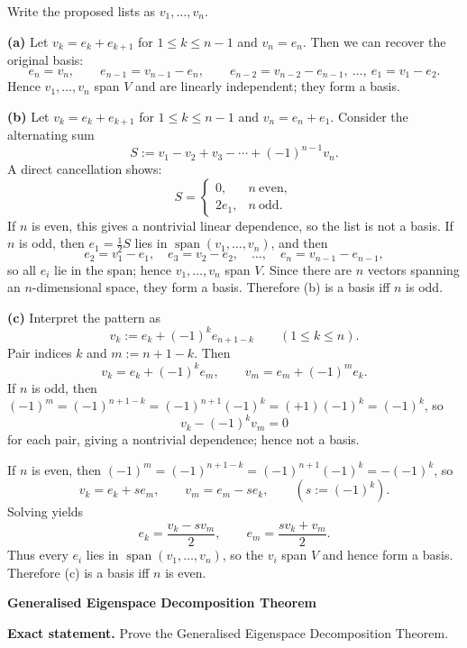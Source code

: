 \begin{solution}
Write the proposed lists as $v_1,\dots,v_n$.

\medskip
\noindent\textbf{(a)} Let $v_k=e_k+e_{k+1}$ for $1\le k\le n-1$ and $v_n=e_n$.
Then we can recover the original basis:
\[
e_n=v_n,\qquad
e_{n-1}=v_{n-1}-e_n,\qquad
e_{n-2}=v_{n-2}-e_{n-1},\ \dots,\
e_1=v_1-e_2.
\]
Hence $v_1,\dots,v_n$ span $V$ and are linearly independent; they form a basis.

\medskip
\noindent\textbf{(b)} Let $v_k=e_k+e_{k+1}$ for $1\le k\le n-1$ and $v_n=e_n+e_1$.
Consider the alternating sum
\[
S:=v_1-v_2+v_3-\cdots+(-1)^{n-1}v_n.
\]
A direct cancellation shows:
\[
S=
\begin{cases}
	0, & n\ \text{even},\\[4pt]
	2e_1, & n\ \text{odd}.
\end{cases}
\]
If $n$ is even, this gives a nontrivial linear dependence, so the list is not a basis.
If $n$ is odd, then $e_1=\tfrac12 S$ lies in $\operatorname{span}(v_1,\dots,v_n)$, and then
\[
e_2=v_1-e_1,\quad e_3=v_2-e_2,\quad \dots,\quad e_n=v_{n-1}-e_{n-1},
\]
so all $e_i$ lie in the span; hence $v_1,\dots,v_n$ span $V$. Since there are $n$ vectors spanning an
$n$-dimensional space, they form a basis. Therefore (b) is a basis iff $n$ is odd.

\medskip
\noindent\textbf{(c)} Interpret the pattern as
\[
v_k:=e_k+(-1)^k e_{n+1-k}\qquad (1\le k\le n).
\]
Pair indices $k$ and $m:=n+1-k$. Then
\[
v_k=e_k+(-1)^k e_m,\qquad
v_m=e_m+(-1)^m e_k.
\]
If $n$ is odd, then $(-1)^m=(-1)^{n+1-k}=(-1)^{n+1}(-1)^k=(+1)(-1)^k=(-1)^k$, so
\[
v_k-(-1)^k v_m = 0
\]
for each pair, giving a nontrivial dependence; hence not a basis.

If $n$ is even, then $(-1)^m=(-1)^{n+1-k}=(-1)^{n+1}(-1)^k=-( -1)^k$, so
\[
v_k=e_k+s e_m,\qquad v_m=e_m-s e_k,\qquad (s:=(-1)^k).
\]
Solving yields
\[
e_k=\frac{v_k-sv_m}{2},\qquad e_m=\frac{sv_k+v_m}{2}.
\]
Thus every $e_i$ lies in $\operatorname{span}(v_1,\dots,v_n)$, so the $v_i$ span $V$ and hence form a basis.
Therefore (c) is a basis iff $n$ is even.

\bigskip
\end{solution}

\begin{problem}[CP-I-0051]
\label{prob:cp-i-0051}
\textbf{Generalised Eigenspace Decomposition Theorem}

\textbf{Exact statement.}
\hspace*{1.5em}Prove the Generalised Eigenspace Decomposition Theorem.

\end{problem}

